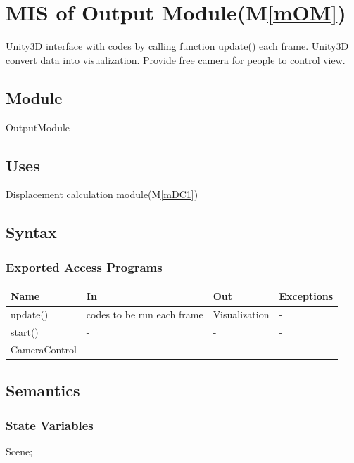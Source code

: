 \documentclass[12pt, titlepage]{article}
\newcommand{\mref}[1]{M\ref{#1}}
\begin{document}
\section{MIS of Output Module(\mref{mOM})}

Unity3D interface with codes by calling function update() each frame. Unity3D convert data into visualization. Provide free camera for people to control view.

\subsection{Module}

OutputModule

\subsection{Uses}

Displacement calculation module(\mref{mDC1})

\subsection{Syntax}

\subsubsection{Exported Access Programs}

\begin{center}
	\begin{tabular}{p{3cm} p{5cm} p{4cm} p{2cm}}
		\hline
		\textbf{Name} & \textbf{In} & \textbf{Out} & \textbf{Exceptions} \\
		\hline
		update() & codes to be run each frame & Visualization & - \\
		start() & - & - & - \\
		CameraControl & - & - & - \\
		\hline
	\end{tabular}
\end{center}

\subsection{Semantics}

\subsubsection{State Variables}
Scene;\\
\end{document}
